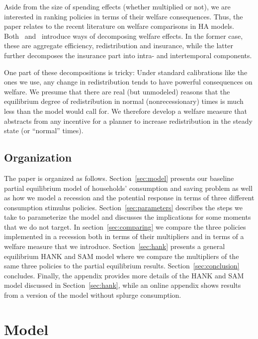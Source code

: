 \documentclass[qe]{econsocart}
\begin{document}
Aside from the size of spending effects (whether multiplied or not), we are interested in ranking policies in terms of their welfare consequences.  Thus, the paper relates to the recent literature on welfare comparisons in HA models.
Both~\cite{bhandari2021efficiency} and~\cite{davila2022welfare} introduce ways of decomposing welfare effects.
In the former case, these are aggregate efficiency, redistribution and insurance, while the latter further decomposes the insurance part into intra- and intertemporal components.

One part of these decompositions is tricky: Under standard calibrations like the ones we use, any change in redistribution tends to have powerful consequences on welfare.  We presume that there are real (but unmodeled) reasons that the equilibrium degree of redistribution in normal (nonrecessionary) times is much less than the model would call for.  We therefore develop a welfare measure that abstracts from any incentive for a planner to increase redistribution in the steady state (or ``normal'' times).

\label{microeconomic-organization}\par\subsection{Organization}
\label{sec:microorg} 

The paper is organized as follows. Section~\ref{sec:model} presents our baseline partial equilibrium model of households' consumption and saving problem as well as how we model a recession and the potential response in terms of three different consumption stimulus policies. Section~\ref{sec:parameters} describes the steps we take to parameterize the model and discusses the implications for some moments that we do not target. In section~\ref{sec:comparing} we compare the three policies implemented in a recession both in terms of their multipliers and in terms of a welfare measure that we introduce. Section~\ref{sec:hank} presents a general equilibrium HANK and SAM model where we compare the multipliers of the same three policies to the partial equilibrium results. Section~\ref{sec:conclusion} concludes. Finally, the appendix provides more details of the HANK and SAM model discussed in Section~\ref{sec:hank}, while an online appendix shows results from a version of the model without splurge consumption.


\section{Model}\label{model}
\label{sec:model} 
\end{document}
